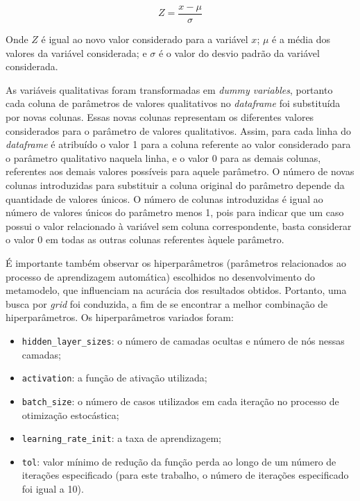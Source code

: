 \documentclass{article}
\begin{document}
\begin{equation}\label{eq:zscore}
Z = \frac{x-\mu}{\sigma}
\end{equation}

Onde $Z$ é igual ao novo valor considerado para a variável $x$; $\mu$ é a média dos valores da variável considerada; e $\sigma$ é o valor do desvio padrão da variável considerada.

As variáveis qualitativas foram transformadas em \textit{dummy variables}, portanto cada coluna de parâmetros de valores qualitativos no \textit{dataframe} foi substituída por novas colunas. Essas novas colunas representam os diferentes valores considerados para o parâmetro de valores qualitativos. 
Assim, para cada linha do \textit{dataframe} é atribuído o valor 1 para a coluna referente ao valor considerado para o parâmetro qualitativo naquela linha, e o valor 0 para as demais colunas, referentes aos demais valores possíveis para aquele parâmetro.
O número de novas colunas introduzidas para substituir a coluna original do parâmetro depende da quantidade de valores únicos. O número de colunas introduzidas é igual ao número de valores únicos do parâmetro menos 1, pois para indicar que um caso possui o valor relacionado à variável sem coluna correspondente, basta considerar o valor 0 em todas as outras colunas referentes àquele parâmetro.

É importante também observar os hiperparâmetros (parâmetros relacionados ao processo de aprendizagem automática) escolhidos no desenvolvimento do metamodelo, que influenciam na acurácia dos resultados obtidos.
Portanto, uma busca por \textit{grid} foi conduzida, a fim de se encontrar a melhor combinação de hiperparâmetros.
Os hiperparâmetros variados foram:

\begin{itemize}
    \item \texttt{hidden\_layer\_sizes}: o número de camadas ocultas e número de nós nessas camadas;
    \item \texttt{activation}: a função de ativação utilizada;
    \item \texttt{batch\_size}: o número de casos utilizados em cada iteração no processo de otimização estocástica;
    \item \texttt{learning\_rate\_init}: a taxa de aprendizagem;
    \item \texttt{tol}: valor mínimo de redução da função perda ao longo de um número de iterações especificado (para este trabalho, o número de iterações especificado foi igual a 10).
\end{itemize}
\end{document}
